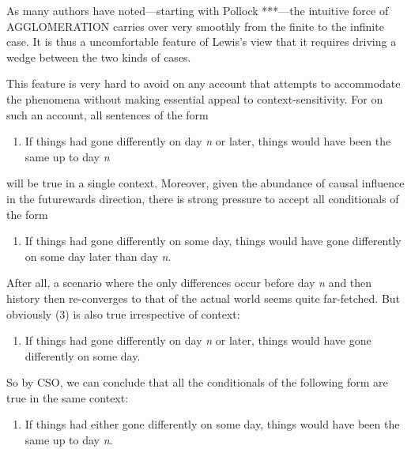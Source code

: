 As many authors have noted---starting with Pollock ***---the intuitive
force of AGGLOMERATION carries over very smoothly from the finite to the
infinite case. It is thus a uncomfortable feature of Lewis's view that
it requires driving a wedge between the two kinds of cases.

This feature is very hard to avoid on any account that attempts to
accommodate the phenomena without making essential appeal to
context-sensitivity. For on such an account, all sentences of the form

\begin{enumerate}
\def\labelenumi{(\arabic{enumi})}
\setcounter{enumi}{52}
\itemsep1pt\parskip0pt
\item
  If things had gone differently on day \emph{n} or later, things would
  have been the same up to day \emph{n}
\end{enumerate}

will be true in a single context. Moreover, given the abundance of
causal influence in the futurewards direction, there is strong pressure
to accept all conditionals of the form

\begin{enumerate}
\def\labelenumi{(\arabic{enumi})}
\setcounter{enumi}{53}
\itemsep1pt\parskip0pt
\item
  If things had gone differently on some day, things would have gone
  differently on some day later than day \emph{n}.
\end{enumerate}

After all, a scenario where the only differences occur before day
\emph{n} and then history then re-converges to that of the actual world
seems quite far-fetched. But obviously (3) is also true irrespective of
context:

\begin{enumerate}
\def\labelenumi{(\arabic{enumi})}
\setcounter{enumi}{54}
\itemsep1pt\parskip0pt
\item
  If things had gone differently on day \emph{n} or later, things would
  have gone differently on some day.
\end{enumerate}

So by CSO, we can conclude that all the conditionals of the following
form are true in the same context:

\begin{enumerate}
\def\labelenumi{(\arabic{enumi})}
\setcounter{enumi}{55}
\itemsep1pt\parskip0pt
\item
  If things had either gone differently on some day, things would have
  been the same up to day \emph{n}.
\end{enumerate}


